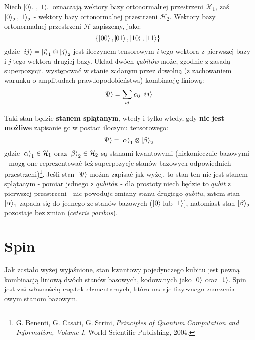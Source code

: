 \documentclass[12pt,a4paper,twoside,openany]{book}
\begin{document}
Niech $\ket{0}_1, \ket{1}_1$ oznaczają wektory bazy ortonormalnej przestrzeni $\mathcal{H}_1$, zaś $\ket{0}_2, \ket{1}_2$ - wektory bazy ortonormalnej przestrzeni $\mathcal{H}_2$. Wektory bazy ortonormalnej przestrzeni $\mathcal{H}$ zapiszemy, jako: 
\begin{equation}
    \{\ket{00}, \ket{01}, \ket{10}, \ket{11}\}
\end{equation}
gdzie $\ket{ij} = \ket{i}_1 \otimes \ket{j}_2$ jest iloczynem tensorowym \textit{i}-tego wektora z pierwszej bazy i \textit{j}-tego wektora drugiej bazy.
Układ dwóch \textit{qubitów} może, zgodnie z zasadą superpozycji, występować w stanie zadanym przez dowolną (z zachowaniem warunku o amplitudach prawdopodobieństwa) kombinację liniową:
\begin{equation}
    \ket{\Psi} = \sum_{ij} \textit{c}_{ij}\ket{ij}
\end{equation}

Taki stan będzie \textbf{stanem splątanym}, wtedy i tylko wtedy, gdy \textbf{nie jest możliwe} zapisanie go w postaci iloczynu tensorowego:
\begin{equation}
    \ket{\Psi} = \ket{\alpha}_1 \otimes \ket{\beta}_2
\end{equation}
gdzie $\ket{\alpha}_1 \in \mathcal{H}_1$ oraz $\ket{\beta}_2 \in \mathcal{H}_2$ są stanami kwantowymi (niekoniecznie bazowymi - mogą one reprezentować też superpozycje stanów bazowych odpowiednich przestrzeni)\footnote{G. Benenti, G. Casati, G. Strini, \textit{Principles of Quantum Computation
and Information, Volume I}, World Scientific Publishing, 2004.}.
Jeśli stan $\ket{\Psi}$ można zapisać jak wyżej, to stan ten nie jest stanem splątanym - pomiar jednego z \textit{qubitów} - dla prostoty niech będzie to \textit{qubit} z pierwszej przestrzeni - nie powoduje zmiany stanu drugiego \textit{qubitu}, zatem stan $\ket{\alpha}_1$ zapada się do jednego ze stanów bazowych ($\ket{0}$ lub $\ket{1}$), natomiast stan $\ket{\beta}_2$ pozostaje bez zmian (\textit{ceteris paribus}).

\section{Spin}

Jak zostało wyżej wyjaśnione, stan kwantowy pojedynczego kubitu jest pewną kombinacją liniową dwóch stanów bazowych, kodowanych jako $\ket{0}$ oraz $\ket{1}$.
Spin jest zaś własnością cząstek elementarnych, która nadaje fizycznego znaczenia owym stanom bazowym.
\end{document}
